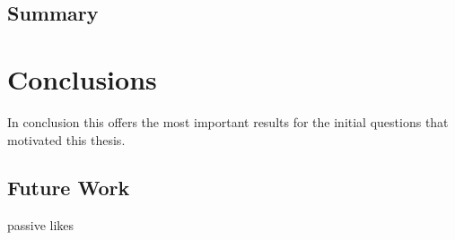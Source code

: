 

\section{Summary}
\label{sec:summary}


\chapter{Conclusions}
\label{cha:conclusions}
In conclusion this offers the most important results for the initial questions that motivated this thesis.

\section{Future Work}
\label{sec:fw}

passive likes

